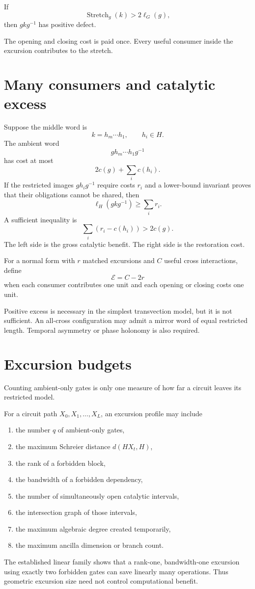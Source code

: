 \begin{proposition}
If
\[
\operatorname{Stretch}_g(k)>2\ell_G(g),
\]
then $gkg^{-1}$ has positive defect.
\end{proposition}
The opening and closing cost is paid once.  Every useful consumer inside the excursion contributes to the stretch.

\section{Many consumers and catalytic excess}
Suppose the middle word is
\[
k=h_m\cdots h_1,
\qquad h_i\in H.
\]
The ambient word
\[
gh_m\cdots h_1g^{-1}
\]
has cost at most
\[
2c(g)+\sum_i c(h_i).
\]
If the restricted images $gh_ig^{-1}$ require costs $r_i$ and a lower-bound invariant proves that their obligations cannot be shared, then
\[
\ell_H(gkg^{-1})\ge\sum_i r_i.
\]
A sufficient inequality is
\[
\sum_i(r_i-c(h_i))>2c(g).
\]
The left side is the gross catalytic benefit.  The right side is the restoration cost.

\begin{definition}
For a normal form with $r$ matched excursions and $C$ useful cross interactions, define
\[
\mathcal E=C-2r
\]
when each consumer contributes one unit and each opening or closing costs one unit.
\end{definition}
Positive excess is necessary in the simplest transvection model, but it is not sufficient.  An all-cross configuration may admit a mirror word of equal restricted length.  Temporal asymmetry or phase holonomy is also required.

\section{Excursion budgets}
Counting ambient-only gates is only one measure of how far a circuit leaves its restricted model.
\begin{definition}
For a circuit path $X_0,X_1,\ldots,X_L$, an excursion profile may include
\begin{enumerate}
\item the number $q$ of ambient-only gates,
\item the maximum Schreier distance $d(HX_t,H)$,
\item the rank of a forbidden block,
\item the bandwidth of a forbidden dependency,
\item the number of simultaneously open catalytic intervals,
\item the intersection graph of those intervals,
\item the maximum algebraic degree created temporarily,
\item the maximum ancilla dimension or branch count.
\end{enumerate}
\end{definition}
The established linear family shows that a rank-one, bandwidth-one excursion using exactly two forbidden gates can save linearly many operations.  Thus geometric excursion size need not control computational benefit.

